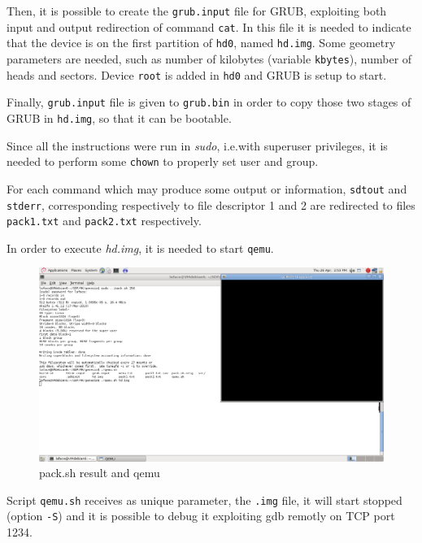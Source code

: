 \documentclass{report}
\begin{document}
Then, it is possible to create the \texttt{grub.input} file for GRUB, exploiting both input and output redirection of command \texttt{cat}. In this file it is needed to indicate that the device is on the first partition of \texttt{hd0}, named \texttt{hd.img}. Some geometry parameters are needed, such as number of kilobytes (variable \texttt{kbytes}), number of heads and sectors. Device \texttt{root} is added in \texttt{hd0} and GRUB is setup to start.

\medskip

Finally, \texttt{grub.input} file is given to \texttt{grub.bin} in order to copy those two stages of GRUB in \texttt{hd.img}, so that it can be bootable.

Since all the instructions were run in \emph{sudo}, i.e.\@ with superuser privileges, it is needed to perform some \texttt{chown} to properly set user and group.

\bigskip
For each command which may produce some output or information, \texttt{sdtout} and \texttt{stderr}, corresponding respectively to file descriptor 1 and 2 are redirected to files \texttt{pack1.txt} and \texttt{pack2.txt} respectively.

\newpage

In order to execute \emph{hd.img}, it is needed to start \texttt{qemu}.

\begin{figure}[hbtp]
\centering
\includegraphics[scale=0.24]{images/es01/01_pack_qemu.png}
\caption{pack.sh result and qemu}
\end{figure}

Script \texttt{qemu.sh} receives as unique parameter, the \texttt{.img} file, it will start stopped (option \texttt{-S}) and it is possible to debug it exploiting gdb remotly on TCP port 1234.
\end{document}

